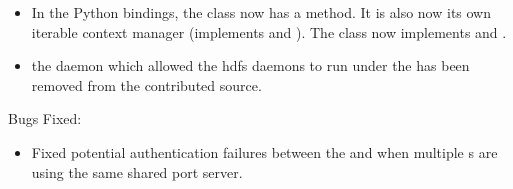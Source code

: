 \begin{itemize}
\item In the Python bindings, the  class now has a
 method.  It is also now its own iterable context manager
(implements  and ).
The  class now implements  and .

\item the  daemon which allowed the hdfs daemons to run under
the  has been removed from the contributed source.

\end{itemize}

\noindent Bugs Fixed:

\begin{itemize}

\item Fixed potential authentication failures between the 
and  when multiple s are using the same
shared port server.

\end{itemize}

